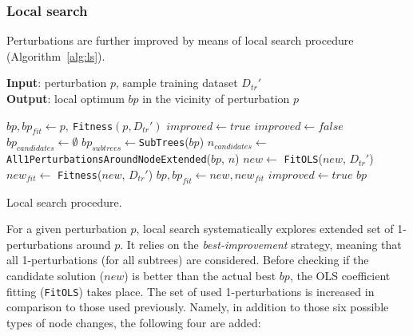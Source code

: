 \documentclass[a4paper,12pt]{elsarticle}
\begin{document}
\subsubsection{Local search}\label{sec:ls}

Perturbations are further improved by means of local search procedure (Algorithm~\ref{alg:ls}). 

\begin{algorithm}
	\hspace*{\algorithmicindent} \textbf{Input}: perturbation $p$, sample training dataset $D_{tr}'$ \\
	\hspace*{\algorithmicindent} \textbf{Output}: local optimum $bp$ in the vicinity of perturbation $p$
	\begin{algorithmic}[1] 
		\State $bp, bp_{fit} \gets p,\ $\texttt{Fitness}$(p,D_{tr}')$ 
		\State $improved \gets true$
		\State $improved \gets false$
		\State $bp_{candidates} \gets \emptyset$
		\State $bp_{subtrees} \gets $\texttt{SubTrees}($bp$)
		\State $n_{candidates} \gets $ \texttt{All1PerturbationsAroundNodeExtended}($bp$, $n$)
		\State $new \gets$ \texttt{FitOLS}($new$, $D_{tr}'$)
		\State $new_{fit} \gets$ \texttt{Fitness}($new$, $D_{tr}'$)
		\State $bp, bp_{fit} \gets new, new_{fit}$
		\State $improved \gets true$
		\EndIf
		\EndFor
		\EndFor
		\EndWhile
		\State \Return $bp$
		\EndProcedure
	\end{algorithmic}
	\caption{Local search procedure.}
	\label{alg:ls}
\end{algorithm}  

For a given perturbation $p$, local search systematically explores extended set of 1-perturbations around $p$. It relies on the \emph{best-improvement} strategy, meaning that all 1-perturbations (for all subtrees) are considered. Before checking if the candidate solution ($new$) is better than the actual best $bp$, the OLS coefficient fitting (\texttt{FitOLS}) takes place.  
The set of used 1-perturbations is increased in comparison to those used previously. Namely, in addition to those six possible types of node changes, the following four are added:
\end{document}
